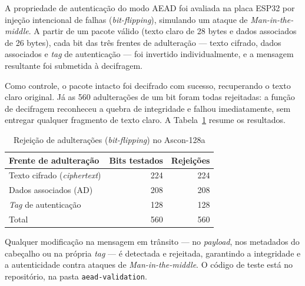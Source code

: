 A propriedade de autenticação do modo AEAD foi avaliada na placa ESP32 por injeção intencional de falhas (\textit{bit-flipping}), simulando um ataque de \textit{Man-in-the-middle}. A partir de um pacote válido (texto claro de 28 bytes e dados associados de 26 bytes), cada bit das três frentes de adulteração — texto cifrado, dados associados e \textit{tag} de autenticação — foi invertido individualmente, e a mensagem resultante foi submetida à decifragem.

Como controle, o pacote intacto foi decifrado com sucesso, recuperando o texto claro original. Já as 560 adulterações de um bit foram todas rejeitadas: a função de decifragem reconheceu a quebra de integridade e falhou imediatamente, sem entregar qualquer fragmento de texto claro. A Tabela~\ref{tab:aead_ascon128a} resume os resultados.

\begin{table}[htb]
\centering
\caption{Rejeição de adulterações (\textit{bit-flipping}) no Ascon-128a}
\label{tab:aead_ascon128a}
\begin{tabular}{lrr}
\hline
\textbf{Frente de adulteração} & \textbf{Bits testados} & \textbf{Rejeições} \\
\hline
Texto cifrado (\textit{ciphertext}) & 224 & 224 \\
Dados associados (AD)               & 208 & 208 \\
\textit{Tag} de autenticação        & 128 & 128 \\
\hline
Total                               & 560 & 560 \\
\hline
\end{tabular}
\end{table}

Qualquer modificação na mensagem em trânsito — no \textit{payload}, nos metadados do cabeçalho ou na própria \textit{tag} — é detectada e rejeitada, garantindo a integridade e a autenticidade contra ataques de \textit{Man-in-the-middle}. O código de teste está no repositório, na pasta \texttt{aead-validation}.

